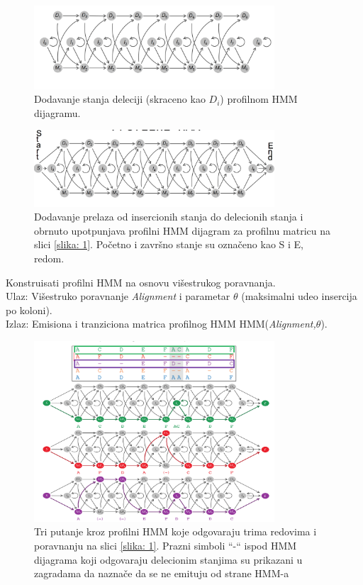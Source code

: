 \begin{figure}[H]
\centering
\includegraphics[width=0.8\textwidth]{poglavlja/10/slike/slika5.png}
\caption{Dodavanje stanja deleciji (skraceno kao $D_i$) profilnom HMM dijagramu.}
\label{slika: 5}
\end{figure}

\begin{figure}[H]
\centering
\includegraphics[width=0.8\textwidth]{poglavlja/10/slike/slika6.png}
\caption{Dodavanje prelaza od insercionih stanja do delecionih stanja i obrnuto upotpunjava profilni HMM dijagram za profilnu matricu na slici \ref{slika: 1}. Početno i završno stanje su označeno kao S i E, redom.}
\label{slika: 6}
\end{figure}

\begin{problem}
	Konstruisati profilni HMM na osnovu višestrukog poravnanja.\\
	Ulaz: Višestruko poravnanje \textit{Alignment} i parametar $\theta$
(maksimalni udeo insercija po koloni). \\
	Izlaz: Emisiona i tranziciona matrica profilnog HMM HMM(\textit{Alignment,$\theta$}). 
\end{problem}

\begin{figure}[H]
\centering
\includegraphics[width=0.8\textwidth]{poglavlja/10/slike/slika7.png}
\caption{Tri putanje kroz profilni HMM koje odgovaraju trima redovima i poravnanju na slici \ref{slika: 1}. Prazni simboli ``-`` ispod HMM dijagrama koji odgovaraju delecionim stanjima su prikazani u zagradama da naznače da se ne emituju od strane HMM-a}
\label{slika: 7}
\end{figure}

